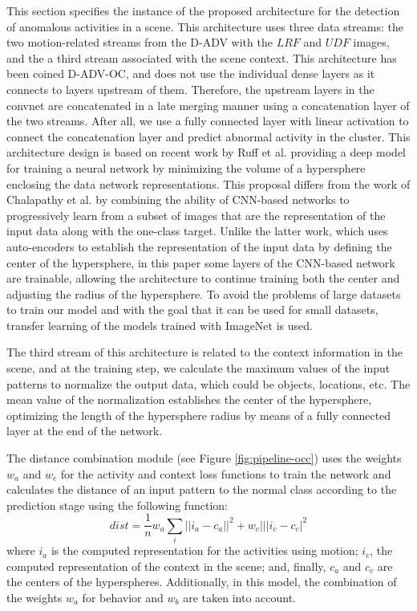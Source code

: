 This section specifies the instance of the proposed architecture for the detection of anomalous activities in a scene. This architecture uses three data streams: the two motion-related streams from the D-ADV with the $LRF$ and $UDF$ images, and the a third stream associated with the scene context. This architecture has been coined D-ADV-OC, and does not use the individual dense layers as it connects to layers upstream of them. Therefore, the upstream layers in the convnet are concatenated in a late merging manner using a concatenation layer of the two streams. After all, we use a fully connected layer with linear activation to connect the concatenation layer and predict abnormal activity in the cluster. This architecture design is based on recent work by Ruff et al. \cite{pmlr-v80-ruff18a} providing a deep model for training a neural network by minimizing the volume of a hypersphere enclosing the data network representations. This proposal differs from the work of Chalapathy et al. \cite{chalapathy2018anomaly} by combining the ability of CNN-based networks to progressively learn from a subset of images that are the representation of the input data along with the one-class target. Unlike the latter work, which uses auto-encoders to establish the representation of the input data by defining the center of the hypersphere, in this paper some layers of the CNN-based network are trainable, allowing the architecture to continue training both the center and adjusting the radius of the hypersphere. To avoid the problems of large datasets to train our model and with the goal that it can be used for small datasets, transfer learning of the models trained with ImageNet is used.

The third stream of this architecture is related to the context information in the scene, and at the training step, we calculate the maximum values of the input patterns to normalize the output data, which could be objects, locations, etc. The mean value of the normalization establishes the center of the hypersphere, optimizing the length of the hypersphere radius by means of a fully connected layer at the end of the network.

The distance combination module (see Figure \ref{fig:pipeline-occ}) uses the weights $w_a$ and $w_c$ for the activity and context loss functions to train the network and calculates the distance of an input pattern to the normal class according to the prediction stage using the following function:
$$ dist = \frac{1}{n} w_a \sum_{i}{||i_a - c_a ||^2 + w_c|||i_c - c_c |^2 }$$ 
where $i_a$ is the computed representation for the activities using motion; $i_c$, the computed representation of the context in the scene; and, finally, $c_a$ and $c_c$ are the centers of the hyperspheres. Additionally, in this model, the combination of the weights $w_a$ for behavior and $w_b$ are taken into account.
